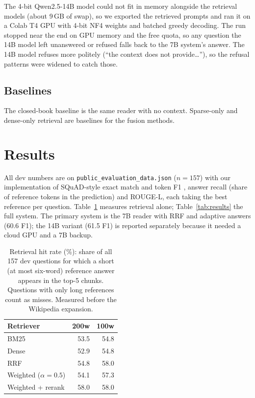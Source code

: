 \documentclass[11pt]{article}
\begin{document}
The 4-bit Qwen2.5-14B model could not fit in memory alongside the retrieval models (about 9\,GB of swap), so we exported the retrieved prompts and ran it on a Colab T4 GPU with 4-bit NF4 weights and batched greedy decoding. The run stopped near the end on GPU memory and the free quota, so any question the 14B model left unanswered or refused falls back to the 7B system's answer. The 14B model refuses more politely (``the context does not provide\ldots''), so the refusal patterns were widened to catch those.

\subsection{Baselines}

The closed-book baseline is the same reader with no context. Sparse-only and dense-only retrieval are baselines for the fusion methods.

\section{Results}
\label{sec:results}

All dev numbers are on \texttt{public\_evaluation\_data.json} ($n{=}157$) with our implementation of SQuAD-style exact match and token F1 \citep{rajpurkar2016squad}, answer recall (share of reference tokens in the prediction) and ROUGE-L, each taking the best reference per question. Table~\ref{tab:retrieval} measures retrieval alone; Table~\ref{tab:results} the full system. The primary system is the 7B reader with RRF and adaptive answers (60.6 F1); the 14B variant (61.5 F1) is reported separately because it needed a cloud GPU and a 7B backup.

\begin{table}[t]
  \centering
  \small
  \begin{tabular}{lrr}
    \toprule
    Retriever & 200w & 100w \\
    \midrule
    BM25 & 53.5 & 54.8 \\
    Dense & 52.9 & 54.8 \\
    RRF & 54.8 & 58.0 \\
    Weighted ($\alpha{=}0.5$) & 54.1 & 57.3 \\
    Weighted + rerank & 58.0 & 58.0 \\
    \bottomrule
  \end{tabular}
  \caption{Retrieval hit rate (\%): share of all 157 dev questions for which a short (at most six-word) reference answer appears in the top-5 chunks. Questions with only long references count as misses. Measured before the Wikipedia expansion.}
  \label{tab:retrieval}
\end{table}
\end{document}
